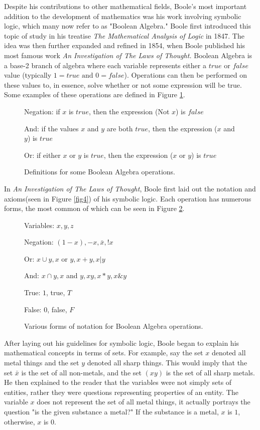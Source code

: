\documentclass[12]{article} %
\begin{document}
Despite his contributions to other mathematical fields, Boole's most important addition to the development of mathematics was his work involving symbolic logic, which many now refer to as "Boolean Algebra." Boole first introduced this topic of study in his treatise \textit{The Mathematical Analysis of Logic} in 1847. The idea was then further expanded and refined in 1854, when Boole published his most famous work \textit{An Investigation of The Laws of Thought.} Boolean Algebra is a base-2 branch of algebra where each variable represents either a $true$ or $false$ value (typically $1 = true \text{ and } 0 = false$). Operations can then be performed on these values to, in essence, solve whether or not some expression will be true. Some examples of these operations are defined in Figure \ref{fig2}. 


\begin{figure}[H]
\begin{mdframed}
\centerline{Negation: if $x$ is $true$, then the expression (Not $x$) is $false$}
\centerline{And: if the values $x$ and $y$ are both $true$, then the expression ($x$ and $y$) is $true$}  
\centerline{Or: if either $x$ or $y$ is $true$, then the expression ($x$ or $y$) is $true$}
\end{mdframed}
\caption{Definitions for some Boolean Algebra operations.}\label{fig2}
\end{figure}


In \textit{An Investigation of The Laws of Thought}, Boole first laid out the notation and axioms(seen in Figure \ref{fig4}) of his symbolic logic. Each operation has numerous forms, the most common of which can be seen in Figure \ref{fig3}.

\begin{figure}[H]
\centerline{Variables: $x,y,z$}
\centerline{Negation: $(1-x), -x, \bar{x}, !x$}
\centerline{Or: $x\cup y, x$ or $y, x + y, x | y$}
\centerline{And: $x \cap y, x$ and $y, xy, x*y, x \& y$}
\centerline{True: $1$, true, $T$}
\centerline{False: $0$, false, $F$}
\caption{Various forms of notation for Boolean Algebra operations.}\label{fig3}
\end{figure}
\noindent

After laying out his guidelines for symbolic logic, Boole began to explain his mathematical concepts in terms of sets. For example, say the set $x$ denoted all metal things and the set $y$ denoted all sharp things. This would imply that the set $\bar{x}$ is the set of all non-metals, and the set $(xy)$ is the set of all sharp metals. He then explained to the reader that the variables were not simply sets of entities, rather they were questions representing properties of an entity. The variable $x$ does not represent the set of all metal things, it actually portrays the question "is the given substance a metal?" If the substance is a metal, $x$ is $1$, otherwise, $x$ is $0$. 
\end{document}
